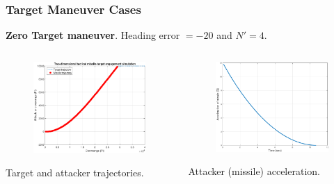 \documentclass{beamer}
\begin{document}
\begin{frame}
\frametitle{Target Maneuver Cases}

\textbf{Zero Target maneuver}. Heading error $=-20$ and $N'= 4$.
\begin{columns}[c]
	\begin{column}{.45\linewidth}
		\begin{figure}[H]
			\centering
			\includegraphics[scale = 0.225]{fig/trajectoryXNT0HE20N4.pdf}
			\label{trajectory20N4}
		\end{figure}
		Target and attacker trajectories.
	\end{column}
	\begin{column}{.45\linewidth}
		\begin{figure}[H]
			\centering
			\includegraphics[scale = 0.225]{fig/MissileAccelerationXNT0HE20N4.pdf}
			\label{missile acceleration20N4}
		\end{figure}
		Attacker (missile) acceleration.
	\end{column}
\end{columns}
\end{frame}
\end{document}
